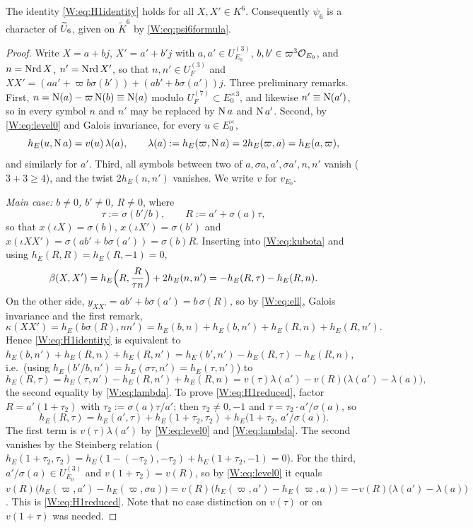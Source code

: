 \begin{proposition}[(H1) holds]\label{W:prop:H1}
The identity \eqref{W:eq:H1identity} holds for all $X,X'\in K^6$.
Consequently $\psi_6$ is a character of $\widetilde U_6$, given on
$\tilde K^6$ by \eqref{W:eq:psi6formula}.
\end{proposition}
\begin{proof}
Write $X=a+bj$, $X'=a'+b'j$ with $a,a'\in U^{(3)}_{E_0}$, $b,b'\in\varpi^3\mathcal O_{E_0}$,
and $n=\operatorname{Nrd} X$, $n'=\operatorname{Nrd} X'$, so that $n,n'\in U_F^{(3)}$ and
$XX'=(aa'+\varpi b\sigma(b'))+(ab'+b\sigma(a'))j$.  Three preliminary
remarks.  First, $n=\operatorname N(a)-\varpi\operatorname N(b)\equiv\operatorname N(a)$ modulo
$U^{(7)}_F\subset E_0^{\times3}$, and likewise $n'\equiv\operatorname N(a')$, so in
every symbol $n$ and $n'$ may be replaced by $\operatorname N a$ and $\operatorname N a'$.
Second, by \eqref{W:eq:level0} and Galois invariance, for every
$u\in E_0^\times$,
\begin{equation}\label{W:eq:lambda}
 h_E(u,\operatorname N a)=v(u)\,\lambda(a),\qquad \lambda(a):=h_E(\varpi,\operatorname N a)=2h_E(\varpi,a)=h_E(a,\varpi),
\end{equation}
and similarly for $a'$.  Third, all symbols between two of
$a,\sigma a,a',\sigma a',n,n'$ vanish ($3+3\ge4$), and the twist
$2h_E(n,n')$ vanishes.  We write $v$ for $v_{E_0}$.

\emph{Main case: $b\ne0$, $b'\ne0$, $R\ne0$}, where
\[
 \tau:=\sigma(b'/b),\qquad R:=a'+\sigma(a)\tau,
\]
so that $x(\iota X)=\sigma(b)$, $x(\iota X')=\sigma(b')$ and
$x(\iota XX')=\sigma(ab'+b\sigma(a'))=\sigma(b)R$.  Inserting into
\eqref{W:eq:kubota} and using $h_E(R,R)=h_E(R,-1)=0$,
\begin{equation}\label{W:eq:betaK6}
 \beta(X,X')=h_E\Bigl(R,\frac{R}{\tau n}\Bigr)+2h_E(n,n')=-h_E(R,\tau)-h_E(R,n).
\end{equation}
On the other side, $y_{XX'}=ab'+b\sigma(a')=b\,\sigma(R)$, so by
\eqref{W:eq:ell}, Galois invariance and the first remark,
\[
 \kappa(XX')=h_E(b\sigma(R),nn')=h_E(b,n)+h_E(b,n')+h_E(R,n)+h_E(R,n').
\]
Hence \eqref{W:eq:H1identity} is equivalent to
$h_E(b,n')+h_E(R,n)+h_E(R,n')=h_E(b',n')-h_E(R,\tau)-h_E(R,n)$, i.e.\ (using $h_E(b'/b,n')=h_E(\sigma\tau,n')=h_E(\tau,n')$) to
\begin{equation}\label{W:eq:H1reduced}
 h_E(R,\tau)=h_E(\tau,n')-h_E(R,n')+h_E(R,n)=v(\tau)\lambda(a')-v(R)\bigl(\lambda(a')-\lambda(a)\bigr),
\end{equation}
the second equality by \eqref{W:eq:lambda}.  To prove
\eqref{W:eq:H1reduced}, factor $R=a'(1+\tau_2)$ with
$\tau_2:=\sigma(a)\tau/a'$; then $\tau_2\ne0,-1$ and
$\tau=\tau_2\cdot a'/\sigma(a)$, so
\[
 h_E(R,\tau)=h_E(a',\tau)+h_E(1+\tau_2,\tau_2)+h_E\bigl(1+\tau_2,\,a'/\sigma(a)\bigr).
\]
The first term is $v(\tau)\lambda(a')$ by \eqref{W:eq:level0} and
\eqref{W:eq:lambda}.  The second vanishes by the Steinberg relation
($h_E(1+\tau_2,\tau_2)=h_E(1-(-\tau_2),-\tau_2)+h_E(1+\tau_2,-1)=0$).
For the third, $a'/\sigma(a)\in U^{(3)}_{E_0}$ and $v(1+\tau_2)=v(R)$, so
by \eqref{W:eq:level0} it equals
$v(R)\bigl(h_E(\varpi,a')-h_E(\varpi,\sigma a)\bigr)=v(R)\bigl(h_E(\varpi,a')-h_E(\varpi,a)\bigr)=-v(R)\bigl(\lambda(a')-\lambda(a)\bigr)$.
This is \eqref{W:eq:H1reduced}.  Note that no case distinction on
$v(\tau)$ or on $v(1+\tau)$ was needed.


\end{proof}
